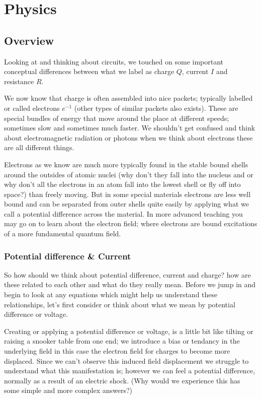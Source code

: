 \chapter{Physics}
\label{ch:physics}

\section{Overview}

Looking at and thinking about circuits, we touched on some important conceptual differences between what we label as charge $Q$, current $I$ and resistance $R$. 

We now know that charge is often assembled into nice packets; typically labelled or called electrons $ e^{-1}$ (other types of similar packets also exists). These are special bundles of energy that move around the place at different speeds; sometimes slow and sometimes much faster. We shouldn't get confused and think about electromagnetic radiation or photons when we think about electrons these are all different things.
 
Electrons as we know are much more typically found in the stable bound shells around the outsides of atomic nuclei (why don't they fall into the nucleus and or why don't all the electrons in an atom fall into the lowest shell or fly off into space?) than freely moving. But in some special materials electrons are less well bound and can be separated from outer shells quite easily by applying what we call a potential difference across the material. In more advanced teaching you may go on to learn about the electron field; where electrons are bound excitations of a more fundamental quantum field.


\subsection{Potential difference \& Current}

So how should we think about potential difference, current and charge? how are these related to each other and what do they really mean. Before we jump in and begin to look at any equations which might help us understand these relationships, let's first consider or think about what we mean by potential difference or voltage. 

Creating or applying a potential difference or voltage, is a little bit like tilting or raising a snooker table from one end; we introduce a bias or tendancy in the underlying field in this case the electron field for charges to become more displaced. Since we can't observe this induced field displacement we struggle to understand what this manifestation is; however we can feel a potential difference, normally as a result of an electric shock. (Why would we experience this has some simple and more complex answers?)


